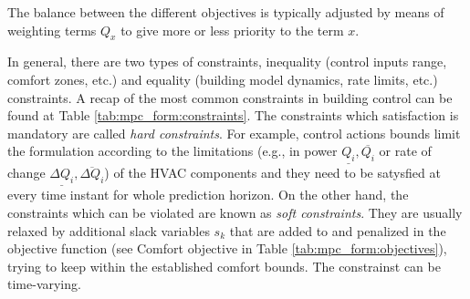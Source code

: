 \documentclass[10pt]{extarticle}
\begin{document}
The balance between the different objectives is typically adjusted
by means of weighting terms $Q_x$ to give more or less priority to the
term $x$.

In general, there are two types of constraints,
inequality  (control inputs range, comfort zones, etc.) and equality 
(building model dynamics, rate limits, etc.) constraints.
A recap of the most common constraints in building control can be found at
Table \ref{tab:mpc_form:constraints}.
The constraints which satisfaction is mandatory are called 
\textit{hard constraints}. For example, control actions
bounds limit the formulation according to the limitations (e.g., in power
$\underline{Q_i}, \overline{Q_i}$ or rate of change $\underline{\Delta Q_i},
\overline{\Delta Q_i}$)
of the HVAC components and they need to be satysfied at every time instant
for whole prediction horizon. On the other hand, the constraints which can 
be violated are known as \textit{soft constraints}. They are usually relaxed
by additional slack variables $s_k$ that are added to and
penalized in the objective function (see Comfort objective in Table
\ref{tab:mpc_form:objectives}), trying to keep within the established
comfort bounds. The constrainst can be time-varying.
\end{document}
